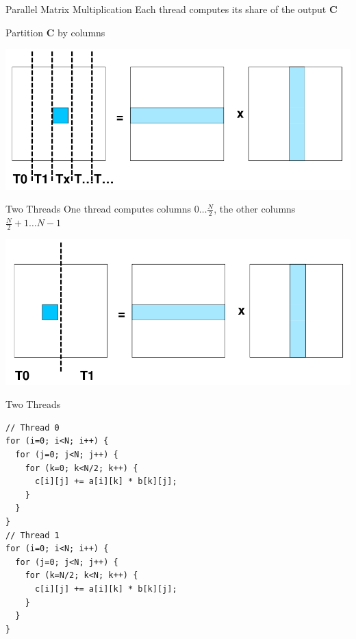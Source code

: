 \begin{frame}{Parallel Matrix Multiplication}
  Each thread computes its share of the output $\mathbf{C}$


 Partition $\mathbf{C}$ by columns


 \includegraphics[width=\textwidth]{figures/matrix-2}
\end{frame}

\begin{frame}{Two Threads}
  One thread computes columns $0 \dots \frac{N}{2}$, the other columns
  $\frac{N}{2} + 1 \ldots N-1$


 \includegraphics[width=\textwidth]{figures/matrix-3}
\end{frame}

\begin{frame}[fragile]{Two Threads}
\begin{lstlisting}
// Thread 0
for (i=0; i<N; i++) {
  for (j=0; j<N; j++) {
    for (k=0; k<N/2; k++) {
      c[i][j] += a[i][k] * b[k][j];
    }
  }
}
// Thread 1
for (i=0; i<N; i++) {
  for (j=0; j<N; j++) {
    for (k=N/2; k<N; k++) {
      c[i][j] += a[i][k] * b[k][j];
    }
  }
}
\end{lstlisting}
\end{frame}

